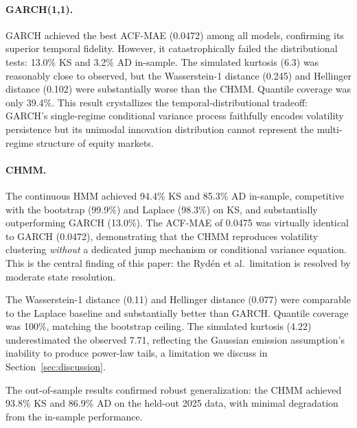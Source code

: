 \paragraph{GARCH(1,1).}
GARCH achieved the best ACF-MAE (0.0472) among all models, confirming its superior temporal fidelity.
However, it catastrophically failed the distributional tests: 13.0\% KS and 3.2\% AD in-sample.
The simulated kurtosis (6.3) was reasonably close to observed, but the Wasserstein-1 distance (0.245) and Hellinger distance (0.102) were substantially worse than the CHMM.
Quantile coverage was only 39.4\%.
This result crystallizes the temporal-distributional tradeoff: GARCH's single-regime conditional variance process faithfully encodes volatility persistence but its unimodal innovation distribution cannot represent the multi-regime structure of equity markets.

\paragraph{CHMM.}
The continuous HMM achieved 94.4\% KS and 85.3\% AD in-sample, competitive with the bootstrap (99.9\%) and Laplace (98.3\%) on KS, and substantially outperforming GARCH (13.0\%).
The ACF-MAE of 0.0475 was virtually identical to GARCH (0.0472), demonstrating that the CHMM reproduces volatility clustering \emph{without} a dedicated jump mechanism or conditional variance equation.
This is the central finding of this paper: the Ryd\'{e}n et al.\ limitation is resolved by moderate state resolution.

The Wasserstein-1 distance (0.11) and Hellinger distance (0.077) were comparable to the Laplace baseline and substantially better than GARCH.
Quantile coverage was 100\%, matching the bootstrap ceiling.
The simulated kurtosis (4.22) underestimated the observed 7.71, reflecting the Gaussian emission assumption's inability to produce power-law tails, a limitation we discuss in Section~\ref{sec:discussion}.

The out-of-sample results confirmed robust generalization: the CHMM achieved 93.8\% KS and 86.9\% AD on the held-out 2025 data, with minimal degradation from the in-sample performance.

